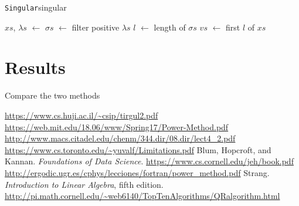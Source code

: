 \documentclass{article}
\def\store{$\leftarrow$ }
\begin{document}
\begin{algo}{\texttt{Singular}}{singular}
  \begin{algorithm}[H]

    \BlankLine
    $xs$, $\lambda s$ \store {}\;
    $\sigma s$ \store filter positive $\lambda s$\;
    $l$ \store length of $\sigma s$\;
    $vs$ \store first $l$ of $xs$\;
  \end{algorithm}
\end{algo}

\section{Results}
Compare the two methods

\begin{thebibliography}{9}
   \url{https://www.cs.huji.ac.il/\~csip/tirgul2.pdf}
   \url{https://web.mit.edu/18.06/www/Spring17/Power-Method.pdf}
   \url{http://www.macs.citadel.edu/chenm/344.dir/08.dir/lect4_2.pdf}
   \url{https://www.cs.toronto.edu/\~yuvalf/Limitations.pdf}
   Blum, Hopcroft, and Kannan. \emph{Foundations of Data Science}. \url{https://www.cs.cornell.edu/jeh/book.pdf}
   \url{http://ergodic.ugr.es/cphys/lecciones/fortran/power_method.pdf}
   Strang. \emph{Introduction to Linear Algebra}, fifth edition.
   \url{http://pi.math.cornell.edu/\~web6140/TopTenAlgorithms/QRalgorithm.html}
\end{thebibliography}
\end{document}

